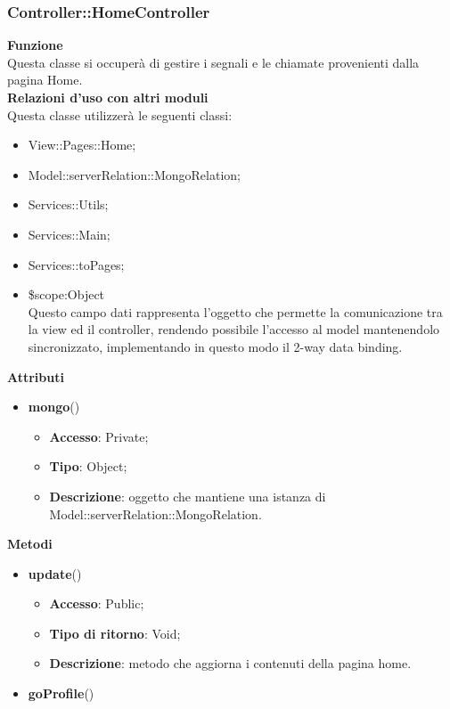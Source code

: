 {\subsubsection{Controller::HomeController}{
	\label{sub:homecontroller}
	\textbf{Funzione}\\
	\indent Questa classe si occuperà di gestire i segnali e le chiamate provenienti dalla pagina Home.\\
	\textbf{Relazioni d'uso con altri moduli}\\
	\indent Questa classe utilizzerà le seguenti classi:
	\begin{itemize}
		\item View::Pages::Home;
		\item Model::\-serverRelation::\-MongoRelation;
		\item Services::Utils;
		\item Services::Main;
		\item Services::toPages;
		\item \$scope:Object\\
			\indent Questo campo dati rappresenta l’oggetto che permette la comunicazione tra la view ed il controller, rendendo possibile l’accesso al model mantenendolo sincronizzato, implementando in questo modo il 2-way data binding.
	\end{itemize}
	\textbf{Attributi}\\
	\begin{itemize}
		\item \textbf{mongo}()
		\begin{itemize}
			\item \textbf{Accesso}: Private;
			\item \textbf{Tipo}: Object;
			\item \textbf{Descrizione}: oggetto che mantiene una istanza di Model::\-serverRelation::\-MongoRelation.
		\end{itemize}
    \end{itemize}
	\textbf{Metodi}
	\begin{itemize}
		\item \textbf{update}()
		\begin{itemize}
			\item \textbf{Accesso}: Public;
			\item \textbf{Tipo di ritorno}: Void;
			\item \textbf{Descrizione}: metodo che aggiorna i contenuti della pagina home.
		\end{itemize}
		\item \textbf{goProfile}()

\end{itemize}}}
